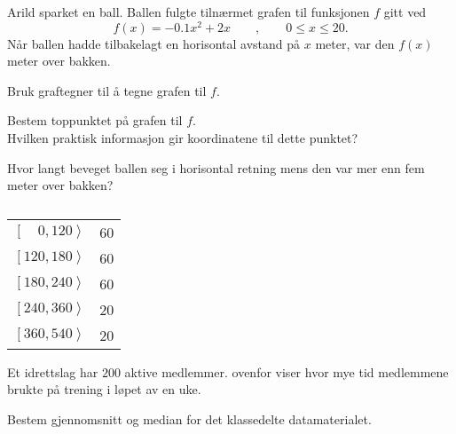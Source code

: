 Arild sparket en ball. Ballen fulgte tilnærmet grafen til funksjonen $f$ gitt ved
%
\begin{equation*}
  f(x) = \num{-0.1}x^2 + 2x \qquad , \qquad 0 \leq x \leq 20.
\end{equation*}
%
Når ballen hadde tilbakelagt en horisontal avstand på $x$ meter, var den $f(x)$
meter over bakken.

\begin{oppgaver}
   Bruk graftegner til å tegne grafen til $f$.
\end{oppgaver}

\begin{oppgaver}
   Bestem toppunktet på grafen til $f$. \\
    Hvilken praktisk informasjon gir koordinatene til dette punktet?
\end{oppgaver}

\begin{oppgaver}
   Hvor langt beveget ballen seg i horisontal retning mens den var mer
    enn fem meter over bakken?
\end{oppgaver}

\Oppgave[4] 

\begin{table}[H]
  \centering
  \caption{}
  \label{tab:del-2-oppgave-2.2}
  \begin{tabular}{|l | S[table-format=2.0]|}
    $\left[\phantom{00}0,120\right\rangle$ & 60 \\
    $\left[120,180\right\rangle$ & 60 \\
    $\left[180,240\right\rangle$ & 60 \\
    $\left[240,360\right\rangle$ & 20 \\
    $\left[360,540\right\rangle$ & 20 \\
    \hline
  \end{tabular}
\end{table}

Et idrettslag har $200$ aktive medlemmer.  ovenfor
viser hvor mye tid medlemmene brukte på trening i løpet av en uke. \bigskip

Bestem gjennomsnitt og median for det klassedelte datamaterialet.

